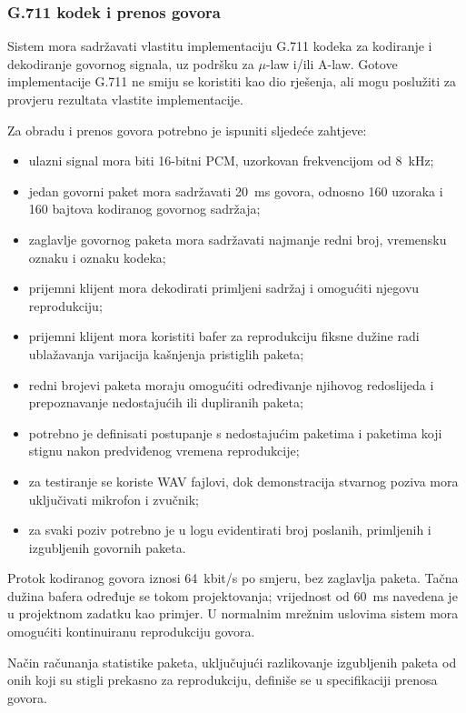 \subsubsection{G.711 kodek i prenos govora}

Sistem mora sadržavati vlastitu implementaciju G.711 kodeka za kodiranje i dekodiranje govornog signala, uz podršku za $\mu$-law i/ili A-law. Gotove implementacije G.711 ne smiju se koristiti kao dio rješenja, ali mogu poslužiti za provjeru rezultata vlastite implementacije.

Za obradu i prenos govora potrebno je ispuniti sljedeće zahtjeve:
\begin{itemize}
    \item ulazni signal mora biti 16-bitni PCM, uzorkovan frekvencijom od 8~kHz;
    \item jedan govorni paket mora sadržavati 20~ms govora, odnosno 160 uzoraka i 160 bajtova kodiranog govornog sadržaja;
    \item zaglavlje govornog paketa mora sadržavati najmanje redni broj, vremensku oznaku i oznaku kodeka;
    \item prijemni klijent mora dekodirati primljeni sadržaj i omogućiti njegovu reprodukciju;
    \item prijemni klijent mora koristiti bafer za reprodukciju fiksne dužine radi ublažavanja varijacija kašnjenja pristiglih paketa;
    \item redni brojevi paketa moraju omogućiti određivanje njihovog redoslijeda i prepoznavanje nedostajućih ili dupliranih paketa;
    \item potrebno je definisati postupanje s nedostajućim paketima i paketima koji stignu nakon predviđenog vremena reprodukcije;
    \item za testiranje se koriste WAV fajlovi, dok demonstracija stvarnog poziva mora uključivati mikrofon i zvučnik;
    \item za svaki poziv potrebno je u logu evidentirati broj poslanih, primljenih i izgubljenih govornih paketa.
\end{itemize}

Protok kodiranog govora iznosi 64~kbit/s po smjeru, bez zaglavlja paketa. Tačna dužina bafera određuje se tokom projektovanja; vrijednost od 60~ms navedena je u projektnom zadatku kao primjer. U normalnim mrežnim uslovima sistem mora omogućiti kontinuiranu reprodukciju govora.

Način računanja statistike paketa, uključujući razlikovanje izgubljenih paketa od onih koji su stigli prekasno za reprodukciju, definiše se u specifikaciji prenosa govora.


